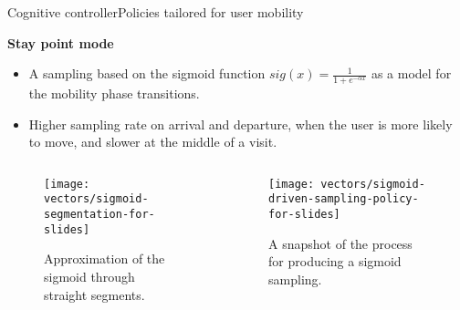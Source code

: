 \begin{frame}[noframenumbering]{Cognitive controller}{Policies tailored for user mobility}
\small
\begin{block}{\small \textbf{Stay point mode}}
  \begin{itemize}
      \item A sampling based on the sigmoid function $sig(x) = \frac{1}{1+e^{-\alpha x}}$ as a model for the mobility phase transitions.
      \item Higher sampling rate on arrival and departure, when the user is more likely to move, and slower at the middle of a visit.
  \end{itemize}
\end{block}

\begin{columns}
\begin{column}{0.45\textwidth}
\begin{figure}
  \centering
  \texttt{[image: vectors/sigmoid-segmentation-for-slides]}
  \caption{Approximation of the sigmoid through straight segments.}
\end{figure}
\end{column}

\begin{column}{0.55\textwidth}
\begin{figure}
  \centering
  \texttt{[image: vectors/sigmoid-driven-sampling-policy-for-slides]}
  \caption{A snapshot of the process for producing a sigmoid sampling.}
\end{figure}
\end{column}
\end{columns}
\end{frame}

